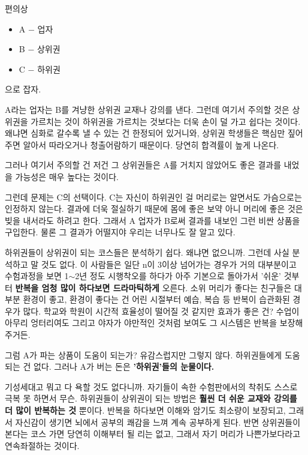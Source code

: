 \vspace{5mm}

편의상
\vspace{5mm}
\begin{itemize}
    \item[] A $-$ 업자
    \item[] B $-$ 상위권
    \item[] C $-$ 하위권
\end{itemize}
\vspace{5mm}

으로 잡자.
\vspace{5mm}

A라는 업자는 B를 겨냥한 상위권 교재나 강의를 낸다.
그런데 여기서 주의할 것은 상위권을 가르치는 것이 하위권을 가르치는 것보다는 더욱 손이 덜 가고 쉽다는 것이다.
왜냐면 심화로 갈수록 낼 수 있는 건 한정되어 있거니와, 상위권 학생들은 핵심만 짚어주면 알아서 따라오거나 청출어람하기 때문이다.
당연히 합격률이 높게 나온다.
\vspace{5mm}

그러나 여기서 주의할 건 저건 그 상위권들은 A를 거치지 않았어도 좋은 결과를 내었을 가능성은 매우 높다는 것이다.
\vspace{5mm}

그런데 문제는 C의 선택이다.
C는 자신이 하위권인 걸 머리로는 알면서도 가슴으로는 인정하지 않는다.
결과에 더욱 절실하기 때문에 몸에 좋은 보약 아니 머리에 좋은 것은 빚을 내서라도 하려고 한다.
그래서 A 업자가 B로써 결과를 내보인 그런 비싼 상품을 구입한다.
물론 그 결과가 어떨지야 우리는 너무나도 잘 알고 있다.
\vspace{5mm}

하위권들이 상위권이 되는 코스들은 분석하기 쉽다. 왜냐면 없으니까.
그런데 사실 분석하고 말 것도 없다. 이 사람들은 일단 n이  3이상 넘어가는 경우가 거의 대부분이고
수험과정을 보면 1$\sim$2년 정도 시행착오를 하다가 아주 기본으로 돌아가서 '쉬운' 것부터 \textbf{반복을 엄청 많이 하다보면 드라마틱하게} 오른다.
소위 머리가 좋다는 친구들은 대부분 환경이 좋고, 환경이 좋다는 건 어린 시절부터 예습, 복습 등 반복이 습관화된 경우가 많다.
학교와 학원이 시간적 효율성이 떨어질 것 같지만 효과가 좋은 건?
수업이 아무리 엉터리여도 그리고 야자가 야만적인 것처럼 보여도 그 시스템은 반복을 보장해주거든.
\vspace{5mm}

그럼 A가 파는 상품이 도움이 되는가?
유감스럽지만 그렇지 않다. 하위권들에게 도움되는 건 없다.
그러나 A가 버는 돈은 \textbf{'하위권'들의 눈물이다.}
\vspace{5mm}

기성세대고 뭐고 다 욕할 것도 없다니까. 자기들이 속한 수험판에서의 착취도 스스로 극복 못 하면서 무슨.
하위권들이 상위권이 되는 방법은 \textbf{훨씬 더 쉬운 교재와 강의를 더 많이 반복하는 것} 뿐이다.
반복을 하다보면 이해와 암기도 최소량이 보장되고, 그래서 자신감이 생기면 뇌에서 공부의 쾌감을 느껴 계속 공부하게 된다.
반면 상위권들이 본다는 코스 가면 당연히 이해부터 될 리는 없고, 그래서 자기 머리가 나쁜가보다라고 연속좌절하는 것이다.
\vspace{5mm}


